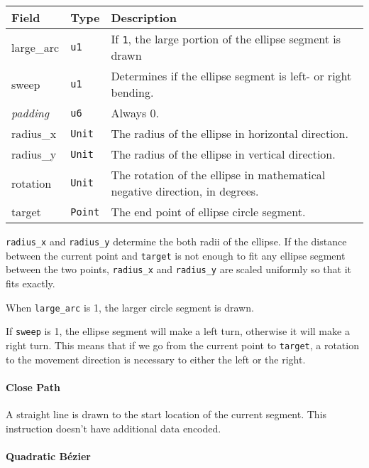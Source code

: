 \documentclass[]{article}
\begin{document}
\begin{longtable}[]{@{}p{1in}p{0.5in}p{4.5in}@{}}
\toprule
Field & Type & Description \\
\midrule
\endhead
large\_arc & \texttt{u1} & If \texttt{1}, the large portion of the ellipse segment is drawn \\
sweep & \texttt{u1} & Determines if the ellipse segment is left- or right bending. \\
\emph{padding} & \texttt{u6} & Always 0. \\
radius\_x & \texttt{Unit} & The radius of the ellipse in horizontal direction. \\
radius\_y & \texttt{Unit} & The radius of the ellipse in vertical direction. \\
rotation & \texttt{Unit} & The rotation of the ellipse in mathematical negative direction, in degrees. \\
target & \texttt{Point} & The end point of ellipse circle segment. \\
\bottomrule
\end{longtable}

\texttt{radius\_x} and \texttt{radius\_y} determine the both radii of
the ellipse. If the distance between the current point and
\texttt{target} is not enough to fit any ellipse segment between the two
points, \texttt{radius\_x} and \texttt{radius\_y} are scaled uniformly
so that it fits exactly.

When \texttt{large\_arc} is 1, the larger circle segment is drawn.

If \texttt{sweep} is 1, the ellipse segment will make a left turn,
otherwise it will make a right turn. This means that if we go from the
current point to \texttt{target}, a rotation to the movement direction
is necessary to either the left or the right.

\hypertarget{close-path}{\paragraph{Close Path}\label{close-path}}

A straight line is drawn to the start location of the current segment.
This instruction doesn't have additional data encoded.

\hypertarget{quadratic-bezier}{%
\paragraph{Quadratic Bézier}\label{quadratic-bezier}}
\end{document}
